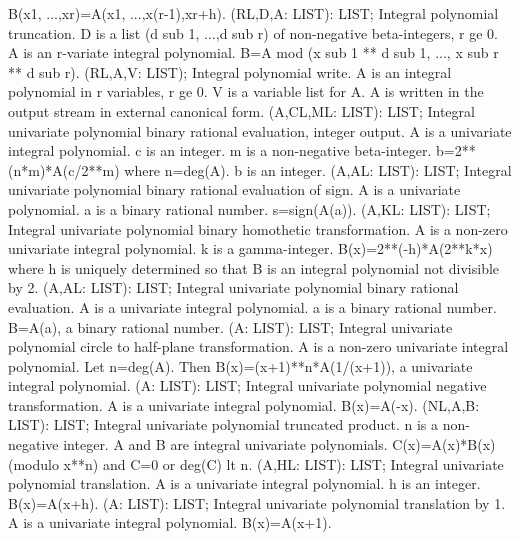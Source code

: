B(x1, ...,xr)=A(x1, ...,x(r-1),xr+h). \ecom 
{} (RL,D,A: LIST): LIST; \eproc
\bcom Integral polynomial truncation. D is a list (d sub 1, ...,d sub r)
of non-negative beta-integers, r ge 0.  A is an r-variate integral
polynomial. B=A mod (x sub 1 ** d sub 1, ..., x sub r ** d sub r). \ecom 
{} (RL,A,V: LIST); \eproc
\bcom Integral polynomial write. A is an integral polynomial in r
variables, r ge 0.  V is a variable list for A.  A is written
in the output stream in external canonical form. \ecom 
{} (A,CL,ML: LIST): LIST; \eproc
\bcom Integral univariate polynomial binary rational evaluation, integer output.
A is a univariate integral polynomial.  c is an integer.  m is a 
non-negative beta-integer.  b=2**(n*m)*A(c/2**m) where n=deg(A).
b is an integer. \ecom 
{} (A,AL: LIST): LIST; \eproc
\bcom Integral univariate polynomial binary rational evaluation of sign.
A is a univariate polynomial.  a is a binary rational number.  
s=sign(A(a)). \ecom 
{} (A,KL: LIST): LIST; \eproc
\bcom Integral univariate polynomial binary homothetic transformation. A
is a non-zero univariate integral polynomial.  k is a gamma-integer.
B(x)=2**(-h)*A(2**k*x) where h is uniquely determined so that B is
an integral polynomial not divisible by 2. \ecom 
{} (A,AL: LIST): LIST; \eproc
\bcom Integral univariate polynomial binary rational evaluation. A is a
univariate integral polynomial.  a is a binary rational number.  
B=A(a), a binary rational number. \ecom 
{} (A: LIST): LIST; \eproc
\bcom Integral univariate polynomial circle to half-plane transformation.
A is a non-zero univariate integral polynomial.  Let n=deg(A).  Then
B(x)=(x+1)**n*A(1/(x+1)), a univariate integral polynomial. \ecom 
{} (A: LIST): LIST; \eproc
\bcom Integral univariate polynomial negative transformation. A is a
univariate integral polynomial. B(x)=A(-x). \ecom 
{} (NL,A,B: LIST): LIST; \eproc
\bcom Integral univariate polynomial truncated product. n is a non-
negative integer.  A and B are integral univariate polynomials.  
C(x)=A(x)*B(x) (modulo x**n) and C=0 or deg(C) lt n. \ecom 
{} (A,HL: LIST): LIST; \eproc
\bcom Integral univariate polynomial translation. A is a univariate
integral polynomial. h is an integer. B(x)=A(x+h). \ecom 
{} (A: LIST): LIST; \eproc
\bcom Integral univariate polynomial translation by 1. A is a univariate
integral polynomial. B(x)=A(x+1). \ecom 
